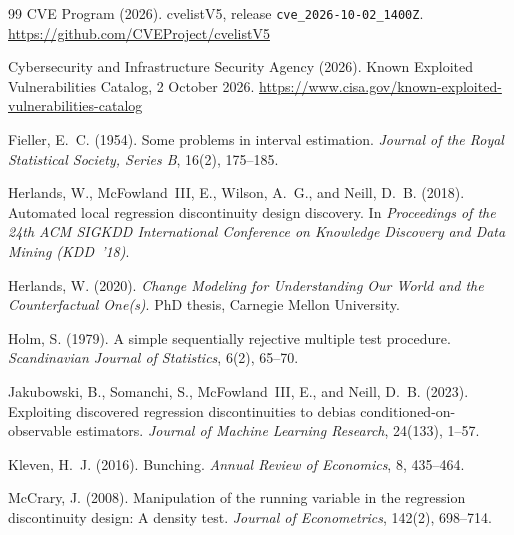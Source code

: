 \documentclass[11pt]{article}
\begin{document}
\begin{thebibliography}{99}
CVE Program (2026).
cvelistV5, release \texttt{cve\_2026-10-02\_1400Z}.
\url{https://github.com/CVEProject/cvelistV5}

Cybersecurity and Infrastructure Security Agency (2026).
Known Exploited Vulnerabilities Catalog, 2 October 2026.
\url{https://www.cisa.gov/known-exploited-vulnerabilities-catalog}

Fieller, E.~C. (1954).
Some problems in interval estimation.
\emph{Journal of the Royal Statistical Society, Series B}, 16(2), 175--185.

Herlands, W., McFowland~III, E., Wilson, A.~G., and Neill, D.~B. (2018).
Automated local regression discontinuity design discovery.
In \emph{Proceedings of the 24th ACM SIGKDD International Conference on Knowledge
Discovery and Data Mining (KDD~'18)}.

Herlands, W. (2020).
\emph{Change Modeling for Understanding Our World and the Counterfactual One(s)}.
PhD thesis, Carnegie Mellon University.

Holm, S. (1979).
A simple sequentially rejective multiple test procedure.
\emph{Scandinavian Journal of Statistics}, 6(2), 65--70.

Jakubowski, B., Somanchi, S., McFowland~III, E., and Neill, D.~B. (2023).
Exploiting discovered regression discontinuities to debias conditioned-on-observable
estimators.
\emph{Journal of Machine Learning Research}, 24(133), 1--57.

Kleven, H.~J. (2016).
Bunching.
\emph{Annual Review of Economics}, 8, 435--464.

McCrary, J. (2008).
Manipulation of the running variable in the regression discontinuity design: A density
test.
\emph{Journal of Econometrics}, 142(2), 698--714.

\end{thebibliography}
\end{document}

